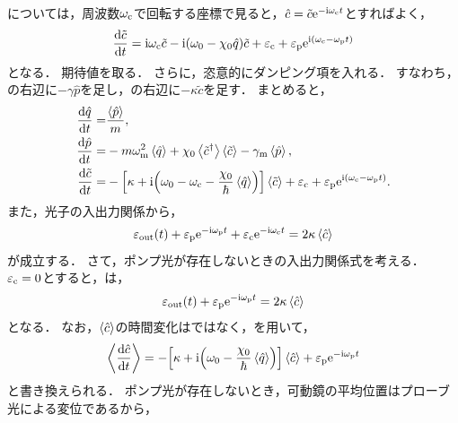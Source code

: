 \documentclass{report}
\begin{document}
      については，周波数$\omega_{\mathrm{c}}$で回転する座標で見ると，$\hat{c} = \tilde{c}\mathrm{e}^{-\mathrm{i}\omega_{\mathrm{c}}t}$とすればよく，
      \begin{align}
        \dv{\tilde{c}}{t} = \mathrm{i}\omega_{\mathrm{c}}\tilde{c} - \mathrm{i}\qty(\omega_0 - \chi_0\hat{q})\tilde{c} + \varepsilon_{\mathrm{c}} + \varepsilon_{\mathrm{p}}\mathrm{e}^{\mathrm{i}\qty(\omega_{\mathrm{c}} - \omega_{\mathrm{p}}t)} \label{PhysRevA.81.041803-eom-c-2}
      \end{align}
      となる．
      期待値を取る．
      さらに，恣意的にダンピング項を入れる．
      すなわち，の右辺に$-\gamma\hat{p}$を足し，の右辺に$-\kappa\tilde{c}$を足す．
      まとめると，
      \begin{align}
        \dv{\hat{q}}{t} =& \frac{\ev{\hat{p}}}{m}, \label{PhysRevA.81.041803-eom-q-ev} \\ 
        \dv{\hat{p}}{t} =& -m\omega^2_{\r{m}}\ev{\hat{q}} + \chi_0\ev{\tilde{c}^{\dag}}\ev{\tilde{c}} - \gamma_{\r{m}}\ev{\hat{p}}, \label{PhysRevA.81.041803-eom-p-ev} \\ 
        \dv{\tilde{c}}{t} =& -\qty[\kappa + \i\qty(\omega_0 - \omega_{\r{c}} - \frac{\chi_0}{\hbar}\ev{\hat{q}})]\ev{\tilde{c}} + \epsilon_{\r{c}} + \epsilon_{\r{p}}\e^{\i\qty(\omega_{\r{c}} - \omega_{\r{p}}t)} \label{PhysRevA.81.041803-eom-c-ev}.
      \end{align}
      また，光子の入出力関係から，
      \begin{align}
        \epsilon_{\r{out}}(t) + \epsilon_{\r{p}}\e^{-\i\omega_{\r{p}}t} + \epsilon_{\r{c}}\e^{-\i\omega_{\r{c}}t} = 2\kappa\ev{\hat{c}} \label{PhysRevA.81.041803-io-relation}
      \end{align}
      が成立する．
      さて，ポンプ光が存在しないときの入出力関係式を考える．
      $\varepsilon_{\mathrm{c}} = 0$とすると，は，
      \begin{align}
        \epsilon_{\r{out}}(t) + \epsilon_{\r{p}}\e^{-\i\omega_{\r{p}}t} = 2\kappa\ev{\hat{c}}
      \end{align}
      となる．
      なお，$\ev{\hat{c}}$の時間変化はではなく，を用いて，
      \begin{align}
        \ev{\dv{\hat{c}}{t}} = -\qty[\kappa + \i\qty(\omega_0 - \frac{\chi_0}{\hbar}\ev{\hat{q}})]\ev{\hat{c}} + \epsilon_{\r{p}}\e^{-\i\omega_{\r{p}}t}
      \end{align}
      と書き換えられる．
      ポンプ光が存在しないとき，可動鏡の平均位置はプローブ光による変位であるから，
\end{document}
